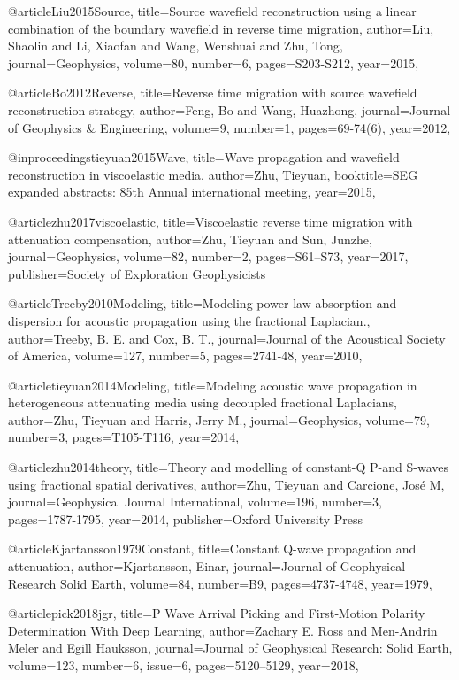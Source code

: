 @article{Liu2015Source,
  title={Source wavefield reconstruction using a linear combination of the boundary wavefield in reverse time migration},
  author={Liu, Shaolin and Li, Xiaofan and Wang, Wenshuai and Zhu, Tong},
  journal={Geophysics},
  volume={80},
  number={6},
  pages={S203-S212},
  year={2015},
}

@article{Bo2012Reverse,
  title={Reverse time migration with source wavefield reconstruction strategy},
  author={Feng, Bo and Wang, Huazhong},
  journal={Journal of Geophysics \& Engineering},
  volume={9},
  number={1},
  pages={69-74(6)},
  year={2012},
}

@inproceedings{tieyuan2015Wave,
  title={Wave propagation and wavefield reconstruction in viscoelastic media},
  author={Zhu, Tieyuan},
  booktitle={SEG expanded abstracts: 85th Annual international meeting},
  year={2015},
}

@article{zhu2017viscoelastic,
  title={Viscoelastic reverse time migration with attenuation compensation},
  author={Zhu, Tieyuan and Sun, Junzhe},
  journal={Geophysics},
  volume={82},
  number={2},
  pages={S61--S73},
  year={2017},
  publisher={Society of Exploration Geophysicists}
}


@article{Treeby2010Modeling,
  title={Modeling power law absorption and dispersion for acoustic propagation using the fractional Laplacian.},
  author={Treeby, B. E. and Cox, B. T.},
  journal={Journal of the Acoustical Society of America},
  volume={127},
  number={5},
  pages={2741-48},
  year={2010},
}

@article{tieyuan2014Modeling,
  title={Modeling acoustic wave propagation in heterogeneous attenuating media using decoupled fractional Laplacians},
  author={Zhu, Tieyuan and Harris, Jerry M.},
  journal={Geophysics},
  volume={79},
  number={3},
  pages={T105-T116},
  year={2014},
}

@article{zhu2014theory,
  title={Theory and modelling of constant-{Q} {P}-and {S}-waves using fractional spatial derivatives},
  author={Zhu, Tieyuan and Carcione, Jos{\'e} M},
  journal={Geophysical Journal International},
  volume={196},
  number={3},
  pages={1787-1795},
  year={2014},
  publisher={Oxford University Press}
}


@article{Kjartansson1979Constant,
  title={Constant {Q}-wave propagation and attenuation},
  author={Kjartansson, Einar},
  journal={Journal of Geophysical Research Solid Earth},
  volume={84},
  number={B9},
  pages={4737-4748},
  year={1979},
}

@article{pick2018jgr,
  title={P Wave Arrival Picking and First‐Motion Polarity Determination With Deep Learning},
  author={Zachary E. Ross and Men-Andrin Meler and Egill Hauksson},
  journal={Journal of Geophysical Research: Solid Earth},
  volume={123},
  number={6},
  issue=6,
  pages={5120–5129},
  year={2018},
}

